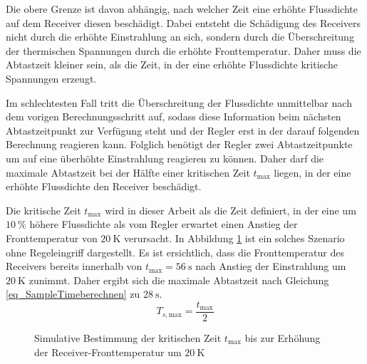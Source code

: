 Die obere Grenze ist davon abhängig, nach welcher Zeit eine erhöhte Flussdichte auf dem Receiver diesen beschädigt.
Dabei entsteht die Schädigung des Receivers nicht durch die erhöhte Einstrahlung an sich, sondern durch die Überschreitung der thermischen Spannungen durch die erhöhte Fronttemperatur.
Daher muss die Abtastzeit kleiner sein, als die Zeit, in der eine erhöhte Flussdichte kritische Spannungen erzeugt.

Im schlechtesten Fall tritt die Überschreitung der Flussdichte unmittelbar nach dem vorigen Berechnungsschritt auf, sodass diese Information beim nächsten Abtastzeitpunkt zur Verfügung steht und der Regler erst in der darauf folgenden Berechnung reagieren kann.
Folglich benötigt der Regler zwei Abtastzeitpunkte um auf eine überhöhte Einstrahlung reagieren zu können.
Daher darf die maximale Abtastzeit bei der Hälfte einer kritischen Zeit $t_{\mathrm{max}}$ liegen, in der eine erhöhte Flussdichte den Receiver beschädigt.

Die kritische Zeit $t_{\mathrm{max}}$ wird in dieser Arbeit als die Zeit definiert, in der eine um $\SI{10}{\percent}$ höhere Flussdichte als vom Regler erwartet einen Anstieg der Fronttemperatur von $\SI{20}{\kelvin}$ verursacht.
In Abbildung \ref{fig_SampleTimebestimmen} ist ein solches Szenario ohne Regeleingriff dargestellt.
Es ist ersichtlich, dass die Fronttemperatur des Receivers bereits innerhalb von $t_{\mathrm{max}} = \SI{56}{\second}$ nach Anstieg der Einstrahlung um $\SI{20}{\kelvin}$ zunimmt.
Daher ergibt sich die maximale Abtastzeit nach Gleichung \ref{eq_SampleTimeberechnen} zu $\SI{28}{\second}$.
\begin{equation} \label{eq_SampleTimeberechnen}
    T_{s, \mathrm{max}} = \frac{t_{\mathrm{max}}}{2}
\end{equation}

\begin{figure}[h!]
    \centering
    \setlength{\fboxsep}{1pt}
    \setlength{\fboxrule}{1pt}
    \caption[Simulative Bestimmung der kritischen Zeit $t_{\mathrm{max}}$ bis zur Erhöhung der Receiver-Fronttemperatur um $\SI{10}{\kelvin}$]{Simulative Bestimmung der kritischen Zeit $t_{\mathrm{max}}$ bis zur Erhöhung der Receiver-Fronttemperatur um $\SI{20}{\kelvin}$}
    \label{fig_SampleTimebestimmen}
\end{figure}

